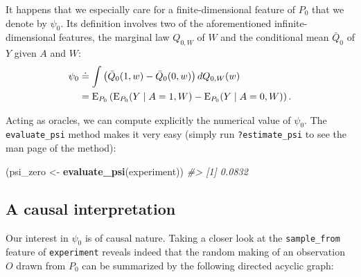 \documentclass[11pt,openright,twoside]{book}
\newenvironment{Shaded}{\begin{snugshade}}{\end{snugshade}}
\newcommand{\CommentTok}[1]{\textcolor[rgb]{0.56,0.35,0.01}{\textit{#1}}}
\newcommand{\KeywordTok}[1]{\textcolor[rgb]{0.13,0.29,0.53}{\textbf{#1}}}
\newcommand{\NormalTok}[1]{#1}
\newcommand{\StringTok}[1]{\textcolor[rgb]{0.31,0.60,0.02}{#1}}
\newcommand{\defq}{\doteq}
\newcommand{\Exp}{\textrm{E}}
\newcommand{\Qbar}{\bar{Q}}
\theoremstyle{definition}
\theoremstyle{definition}
\theoremstyle{definition}
\theoremstyle{remark}
\begin{document}
It happens that we especially care for a finite-dimensional feature of \(P_{0}\)
that we denote by \(\psi_{0}\). Its definition involves two of the
aforementioned infinite-dimensional features, the marginal law \(Q_{0,W}\) of
\(W\) and the conditional mean \(\Qbar_{0}\) of \(Y\) given \(A\) and \(W\):
\begin{align}  \psi_{0}  &\defq  \int \left(\Qbar_{0}(1,  w)  -  \Qbar_{0}(0,
w)\right)    dQ_{0,W}(w)    \label{eq:psi-zero}\\     \notag    &=    \Exp_{P_{0}}
\left(\Exp_{P_0}(Y \mid  A =  1, W)  - \Exp_{P_0}(Y  \mid A  = 0,  W) \right).
\end{align}

Acting as oracles, we can compute explicitly the numerical value of
\(\psi_{0}\). The \texttt{evaluate\_psi} method makes it very easy (simply run
\texttt{?estimate\_psi} to see the man page of the method):

\begin{Shaded}
\begin{Highlighting}[]
\NormalTok{(psi_zero <-}\StringTok{ }\KeywordTok{evaluate_psi}\NormalTok{(experiment))}
\CommentTok{#> [1] 0.0832}
\end{Highlighting}
\end{Shaded}

\hypertarget{causal-interpretation}{%
\subsection{A causal interpretation}\label{causal-interpretation}}

Our interest in \(\psi_{0}\) is of causal nature. Taking a closer look at the
\texttt{sample\_from} feature of \texttt{experiment} reveals indeed that the random making of
an observation \(O\) drawn from \(P_{0}\) can be summarized by the following
directed acyclic graph:
\end{document}
